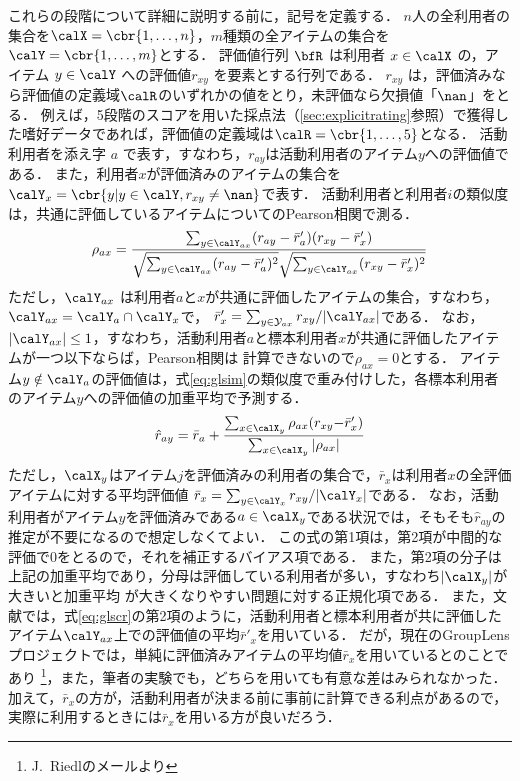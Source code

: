 これらの段階について詳細に説明する前に，記号を定義する．
$n$人の全利用者の集合を$\calX=\cbr{1,\ldots,n}$，$m$種類の全アイテムの集合を$\calY=\cbr{1,\ldots,m}$とする．
評価値行列 $\bfR$ は利用者 $x\in\calX$ の，アイテム $y\in \calY$ への評価値$r_{xy}$ を要素とする行列である．
$r_{xy}$ は，評価済みなら評価値の定義域$\calR$のいずれかの値をとり，未評価なら欠損値「$\nan$」をとる．
例えば，5段階のスコアを用いた採点法（\ref{sec:explicitrating}参照）で獲得した嗜好データであれば，評価値の定義域は$\calR=\cbr{1,\ldots,5}$となる．
活動利用者を添え字 $a$ で表す，すなわち，$r_{ay}$は活動利用者のアイテム$y$への評価値である．
また，利用者$x$が評価済みのアイテムの集合を$\calY_x=\cbr{y| y\in\calY, r_{xy}\ne\nan}$で表す．
活動利用者と利用者$i$の類似度は，共通に評価しているアイテムについてのPearson相関で測る．
\begin{gather}
\rho_{ax}=
\frac{\sum_{y\in\calY_{ax}}(r_{ay}-\bar{r}'_a)(r_{xy}-\bar{r}'_x)}%
{\sqrt{\sum_{y\in\calY_{ax}}(r_{ay}-\bar{r}'_a)^2}\sqrt{\sum_{y\in\calY_{ax}}(r_{xy}-\bar{r}'_x)^2}}
\label{eq:glsim}
\end{gather}
ただし，$\calY_{ax}$ は利用者$a$と$x$が共通に評価したアイテムの集合，すなわち，$\calY_{ax}=\calY_a\cap \calY_x$で，
${\bar{r}'}_x=\sum_{y\in \mathcal{Y}_{ax}}r_{xy}/|\calY_{ax}|$である．
なお，$|\calY_{ax}|\le1$，すなわち，活動利用者$a$と標本利用者$x$が共通に評価したアイテムが一つ以下ならば，Pearson相関は
計算できないので$\rho_{ax}=0$とする．
アイテム$y\notin\calY_a$の評価値は，式\eqref{eq:glsim}の類似度で重み付けした，各標本利用者のアイテム$y$への評価値の加重平均で予測する．
\begin{gather}
\hat{r}_{ay}=
\bar{r}_a+\frac{\sum_{x\in\calX_{y}}\rho_{ax}(r_{xy}{-}\bar{r}'_x)}{\sum_{x\in\calX_{y}}|\rho_{ax}|}
\label{eq:glscr}
\end{gather}
ただし，$\calX_y$はアイテム$j$を評価済みの利用者の集合で，$\bar{r}_{x}$は利用者$x$の全評価アイテムに対する平均評価値 $\bar{r}_x=\sum_{y\in\calY_x}r_{xy}/|\calY_x|$である．
なお，活動利用者がアイテム$y$を評価済みである$a\in\calX_y$である状況では，そもそも$\hat{r}_{ay}$の推定が不要になるので想定しなくてよい．
この式の第1項は，第2項が中間的な評価で0をとるので，それを補正するバイアス項である．
また，第2項の分子は上記の加重平均であり，分母は評価している利用者が多い，すなわち$|\calX_y|$が大きいと加重平均
が大きくなりやすい問題に対する正規化項である．
また，文献\cite{cscw:94:01}では，式\eqref{eq:glscr}の第2項のように，活動利用者と標本利用者が共に評価したアイテム$\calY_{ax}$上での評価値の平均$\bar{r}'_x$を用いている．
だが，現在のGroupLensプロジェクトでは，単純に評価済みアイテムの平均値$\bar{r}_x$を用いているとのことであり%
\footnote{J.~Riedlのメールより}，また，筆者の実験でも，どちらを用いても有意な差はみられなかった．
加えて，$\bar{r}_x$の方が，活動利用者が決まる前に事前に計算できる利点があるので，実際に利用するときには$\bar{r}_x$を用いる方が良いだろう．

